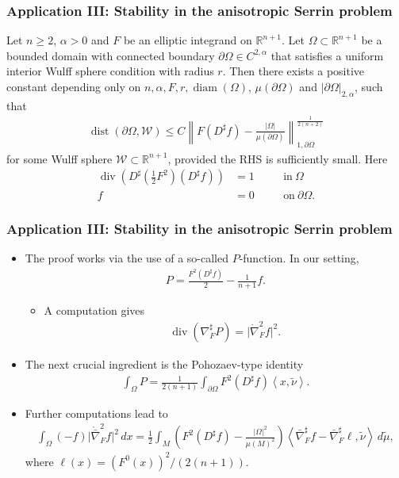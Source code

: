 \documentclass{beamer}
\newcommand{\ti}{\tilde}
\newcommand{\sub}{\subset}
\newcommand{\mr}{\mathring}
\newcommand{\bbR}{\mathbb{R}}
\newcommand{\8}{\infty}
\newcommand{\al}{\alpha}
\newcommand{\Om}{\Omega}
\newcommand{\cW}{\mathcal{W}}
\newcommand{\del}{\partial}
\newcommand{\n}{\nabla}
\newcommand{\ip}[2]{\left\langle #1,#2 \right\rangle}
\newcommand{\fr}[2]{\frac{#1}{#2}}
\newcommand{\tfr}[2]{\tfrac{#1}{#2}}
\DeclareMathOperator{\dive}{div}
\DeclareMathOperator{\dist}{dist}
\DeclareMathOperator{\diam}{diam}
\newcommand{\eq}[1]{\begin{equation}\begin{alignedat}{2} #1 \end{alignedat}\end{equation}}
\newcommand{\br}[1]{\left(#1\right)}
\newcommand{\abs}[1]{\lvert #1\rvert}
\newcommand{\q}{\quad}
\begin{document}
\begin{frame} 
\frametitle{Application III: Stability in the anisotropic Serrin problem}

\begin{theorem}
Let $n\geq 2$, $\al>0$ and $F$ be an elliptic integrand on $\mathbb{R}^{n+1}$.
Let $\Om\sub \bbR^{n+1}$ be a bounded domain with connected boundary $\del\Om\in C^{2,\al}$ that satisfies a uniform interior Wulff sphere condition with radius $r$. 
Then there exists a positive constant depending only on $n,\al, F,r,\diam(\Om)$, $\mu(\del\Om)$ and $\abs{\del\Om}_{2,\al}$, such that
\eq{
\dist(\del\Om,{\cW})
    \leq C
    \left\|F(D^\sharp f)-\tfrac{\vert\Om\vert}{\mu(\del\Om)}\right\|_{1,\del\Om}^{\frac{1}{2(n+2)}}
}
for some Wulff sphere ${\cW}\subset\mathbb{R}^{n+1}$, provided the RHS is sufficiently small. Here 
 \eq{\dive(D^{\sharp}(\tfr 12 F^{2})(D^{\sharp }f)) &=1\q &&\mbox{in}~\Om\\
	f&=0\q &&\mbox{on}~\del\Om.}\end{theorem}
\end{frame}

\begin{frame} 
\frametitle{Application III: Stability in the anisotropic Serrin problem}

\begin{itemize}
\item The proof works via the use of a so-called $P$-function. In our setting,
\eq{P=\fr{F^{2}(D^{\sharp}f)}{2}-\fr{1}{n+1}f.}
	\begin{itemize}
		\item A computation gives
			\eq{\dive(\n^{\sharp}_{F}P) = \abs{\mr\n^{2}_{F}f}^{2}.}
	\end{itemize}
\item The next crucial ingredient is the Pohozaev-type identity
\eq{\int_{\Om}P = \fr{1}{2(n+1)}\int_{\del\Om}F^{2}(D^{\sharp}f)\ip{x}{\ti \nu}.}
\item Further computations lead to
\eq{\label{eq-integral-identity-OverDetermined}
    \int_\Om (-f)\vert\mathring{\bar\n}_{F}^2f\vert^2\,d x
    =\frac12\int_{M}\br{F^2(D^\sharp f)-\fr{\abs{\Om}^{2}}{\mu(M)^{2}}}\left<\bar\nabla^\sharp_Ff-\bar\nabla^\sharp_F\ell,\tilde\nu\right>\,d\tilde\mu,}
    where $\ell(x) = (F^{0}(x))^{2}/(2(n+1)).$
    \end{itemize}

\end{frame}
\end{document}
